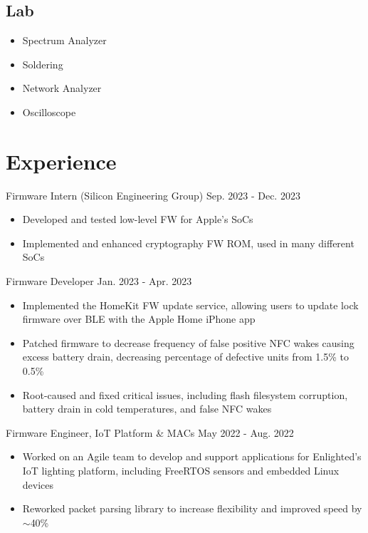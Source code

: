 \documentclass[lighthipster]{styles}
\begin{document}
\begin{paracol}{2}
{\subsection*{Lab}
\vspace{-0.4cm}
\begin{multicols}{2}
    \begin{itemize}
        \item Spectrum Analyzer
        \item Soldering
        \item Network Analyzer
        \item Oscilloscope
    \end{itemize}
\end{multicols}

}
\switchcolumn

\small
\section*{Experience}

{Firmware Intern (Silicon Engineering Group)}
{Sep. 2023 - Dec. 2023}
\begin{itemize}
    \item Developed and tested low-level FW for Apple's SoCs
    \item Implemented and enhanced cryptography FW ROM, used in many different SoCs
\end{itemize}

{Firmware Developer}
{Jan. 2023 - Apr. 2023}
\begin{itemize}
    \item Implemented the HomeKit FW update service, allowing users to update lock
          firmware over BLE with the Apple Home iPhone app
    \item Patched firmware to decrease frequency of false positive NFC wakes
          causing excess battery drain, decreasing percentage of defective
          units from 1.5\% to 0.5\%
    \item Root-caused and fixed critical issues, including flash filesystem
          corruption, battery drain in cold temperatures, and false NFC wakes
\end{itemize}

{Firmware Engineer, IoT Platform \& MACs}
{May 2022 - Aug. 2022}
\begin{itemize}
    \item Worked on an Agile team to develop and support applications for Enlighted's
          IoT lighting platform, including FreeRTOS sensors and embedded Linux devices
    \item Reworked packet parsing library to increase flexibility and improved speed by $\sim$40\%
\end{itemize}


\end{paracol}
\end{document}
